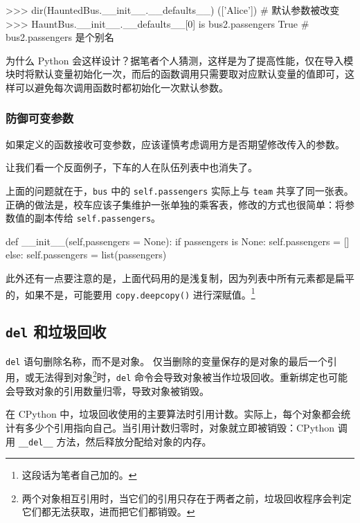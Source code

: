 \begin{python}
>>> dir(HauntedBus.__init__.__defaults__)
(['Alice'])     # 默认参数被改变
>>> HauntBus.__init__.__defaults__[0] is bus2.passengers
True            # bus2.passengers 是个别名
\end{python}

为什么 Python 会这样设计？据笔者个人猜测，这样是为了提高性能，仅在导入模块时将默认变量初始化一次，而后的函数调用只需要取对应默认变量的值即可，这样可以避免每次调用函数时都初始化一次默认参数。

\subsubsection{防御可变参数}

如果定义的函数接收可变参数，应该谨慎考虑调用方是否期望修改传入的参数。

让我们看一个反面例子，下车的人在队伍列表中也消失了。



上面的问题就在于，\texttt{bus} 中的 \texttt{self.passengers} 实际上与 \texttt{team} 共享了同一张表。正确的做法是，校车应该子集维护一张单独的乘客表，修改的方式也很简单：将参数值的副本传给 \texttt{self.passengers}。

\begin{python}
def __init__(self,passengers = None):
    if passengers is None:
        self.passengers = []
    else:
        self.passengers = list(passengers)
\end{python}

此外还有一点要注意的是，上面代码用的是浅复制，因为列表中所有元素都是扁平的，如果不是，可能要用 \texttt{copy.deepcopy()} 进行深赋值。\footnote{这段话为笔者自己加的。}

\subsection{\texttt{del} 和垃圾回收}

\texttt{del} 语句删除名称，而不是对象。 仅当删除的变量保存的是对象的最后一个引用，或无法得到对象\footnote{两个对象相互引用时，当它们的引用只存在于两者之前，垃圾回收程序会判定它们都无法获取，进而把它们都销毁。}时，\texttt{del} 命令会导致对象被当作垃圾回收。重新绑定也可能会导致对象的引用数量归零，导致对象被销毁。

在 CPython 中，垃圾回收使用的主要算法时引用计数。实际上，每个对象都会统计有多少个引用指向自己。当引用计数归零时，对象就立即被销毁：CPython 调用 \texttt{\_\_del\_\_} 方法，然后释放分配给对象的内存。

